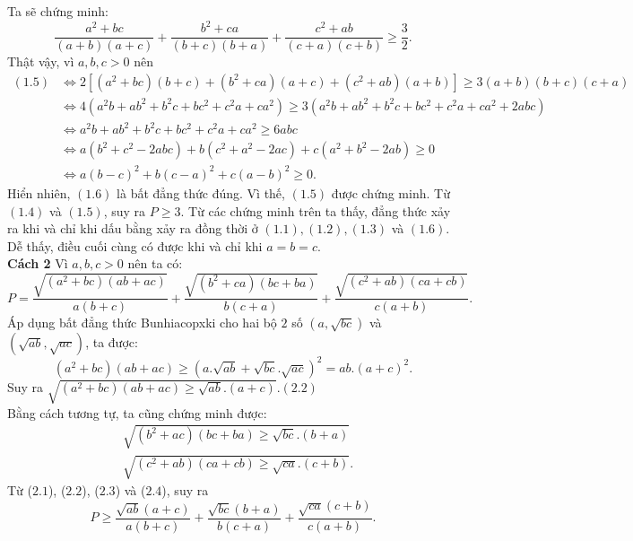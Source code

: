 \begin{bt}
{\noindent Ta sẽ chứng minh: 
\[\dfrac{a^2 + bc}{(a + b)(a + c)} + \dfrac{b^2 + ca}{(b + c)(b + a)} + \dfrac{ c^2 + ab}{(c + a)(c + b)} \geq \dfrac{3}{2}.\tag{1.5}\]
\noindent Thật vậy, vì $a, b, c > 0$ nên 
{\allowdisplaybreaks
\begin{align*}
(1.5) &\Leftrightarrow 2\left[\left(a^2 + bc\right)(b + c) + \left(b^2 + ca\right)(a + c) + \left(c^2 + ab\right)(a + b)\right] \geq 3(a + b)(b + c)(c + a)\\
&\Leftrightarrow 4\left(a^2b + ab^2 + b^2c + bc^2 + c^2a + ca^2\right) \geq 3\left(a^2b + ab^2 + b^2c + bc^2 + c^2a + ca^2 + 2abc\right)\\
&\Leftrightarrow a^2b + ab^2 + b^2c + bc^2 + c^2a + ca^2 \geq 6abc \\
&\Leftrightarrow a\left(b^2 + c^2 - 2abc\right) + b \left(c^2 + a^2 - 2ac\right) + c\left(a^2 + b^2 - 2ab\right) \geq 0 \\
&\Leftrightarrow a(b - c)^2 + b (c - a)^2 + c(a - b)^2 \geq 0. \tag{1.6}
\end{align*}}\noindent Hiển nhiên, $(1.6)$ là bất đẳng thức đúng. Vì thế, $(1.5)$ được chứng minh. 
 Từ $(1.4)$ và $(1.5)$, suy ra $P \geq 3.$ 
 Từ các chứng minh trên ta thấy, đẳng thức xảy ra khi và chỉ khi dấu bằng xảy ra đồng thời ở $(1.1), (1.2), (1.3)$ và $(1.6)$. Dễ thấy, điều cuối cùng có được khi và chỉ khi $a = b = c$. \\
\noindent \textbf{Cách 2}  Vì $a, b, c > 0$ nên ta có: 
\[P = \dfrac{\sqrt{\left(a^2 + bc \right)(ab + ac)}}{a(b + c)} + \dfrac{\sqrt{\left(b^2 + ca \right)(bc + ba)}}{b(c + a)} + \dfrac{\sqrt{\left(c^2 + ab \right)(ca + cb)}}{c(a + b)}.\tag{2.1}\]
\noindent Áp dụng bất đẳng thức Bunhiacopxki cho hai bộ $2$ số $\left(a, \sqrt{bc}\right)$ và $\left(\sqrt{ab}, \sqrt{ac}\right)$, ta được: 
$$\left(a^2 + bc\right)\left(ab + ac\right) \geq \left(a.\sqrt{ab} + \sqrt{bc}.\sqrt{ac}\right)^2 = ab.\left(a+c\right)^2.$$
Suy ra 
$\sqrt{\left(a^2 + bc\right)(ab + ac) \geq \sqrt{ab}. (a + c)}.$\hfill$(2.2)$\\
Bằng cách tương tự, ta cũng chứng minh được: 
{\allowdisplaybreaks
\begin{align*}
&\sqrt{\left(b^2 + ac\right)(bc + ba) \geq \sqrt{bc}. (b + a)}\tag{2.3}\\
&\sqrt{\left(c^2 + ab\right)(ca + cb) \geq \sqrt{ca}. (c + b)}.\tag{2.4}
\end{align*}}Từ ($2.1$), ($2.2$), ($2.3$) và ($2.4$), suy ra 
\[P \geq \dfrac{\sqrt{ab}(a + c)}{a(b + c)} + \dfrac{\sqrt{bc}(b + a)}{b(c + a)} + \dfrac{\sqrt{ca}(c + b)}{c(a + b)}.\tag{2.5}\]
}
\end{bt}

